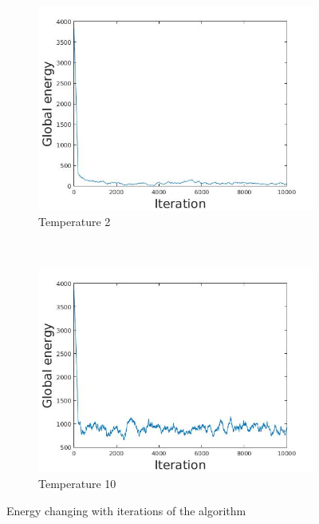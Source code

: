 \documentclass[12pt]{report}
\begin{document}
\begin{figure}[t]
    \centering
    \begin{subfigure}[b]{0.45\textwidth}
        \includegraphics[width=\textwidth]{energy2}
        \caption{Temperature 2}

    \end{subfigure}
	~ 
    \begin{subfigure}[b]{0.45\textwidth}
        \includegraphics[width=\textwidth]{energy10}
        \caption{Temperature 10}

    \end{subfigure}

    \caption{ Energy changing with iterations of the algorithm}
    \label{fig:energyWithTime}
\end{figure}
\end{document}
